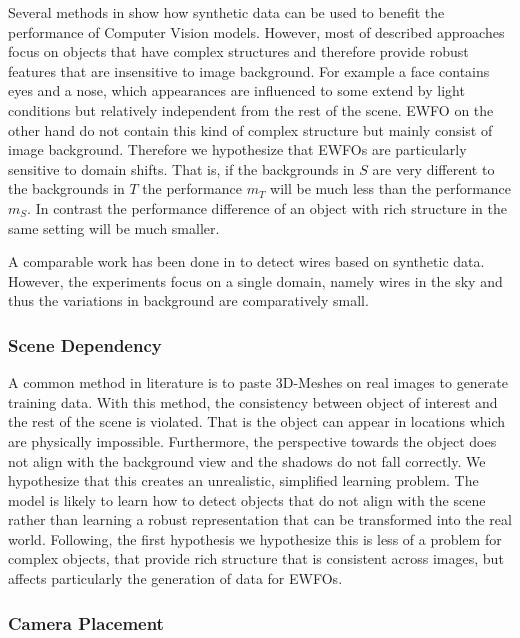 Several methods in  show how synthetic data can be used to benefit the performance of Computer Vision models. However, most of described approaches focus on objects that have complex structures and therefore provide robust features that are insensitive to image background. For example a face contains eyes and a nose, which appearances are influenced to some extend by light conditions but relatively independent from the rest of the scene. \ac{EWFO} on the other hand do not contain this kind of complex structure but mainly consist of image background. Therefore we hypothesize that \acp{EWFO} are particularly sensitive to domain shifts. That is, if the backgrounds in $S$ are very different to the backgrounds in $T$ the performance $m_T$ will be much less than the performance $m_S$. In contrast the performance difference of an object with rich structure in the same setting will be much smaller. 

A comparable work has been done in \cite{Madaan2017} to detect wires based on synthetic data. However, the experiments focus on a single domain, namely wires in the sky and thus the variations in background are comparatively small.

\subsubsection{Scene Dependency}

A common method in literature is to paste 3D-Meshes on real images to generate training data. With this method, the consistency between object of interest and the rest of the scene is violated. That is the object can appear in locations which are physically impossible. Furthermore, the perspective towards the object does not align with the background view and the shadows do not fall correctly. We hypothesize that this creates an unrealistic, simplified learning problem. The model is likely to learn how to detect objects that do not align with the scene rather than learning a robust representation that can be transformed into the real world. Following, the first hypothesis we hypothesize this is less of a problem for complex objects, that provide rich structure that is consistent across images, but affects particularly the generation of data for \acp{EWFO}.

\subsubsection{Camera Placement}

